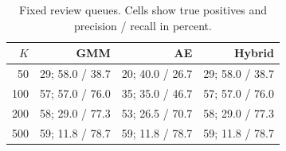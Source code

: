 \begin{table}[H]
\centering\footnotesize\setlength{\tabcolsep}{3pt}
\caption{Fixed review queues. Cells show true positives and precision / recall in percent.}
\label{tab:queues}
\begin{tabular}{rrrr}
\toprule
$K$ & GMM & AE & Hybrid \\
\midrule
50 & 29; 58.0 / 38.7 & 20; 40.0 / 26.7 & 29; 58.0 / 38.7 \\
100 & 57; 57.0 / 76.0 & 35; 35.0 / 46.7 & 57; 57.0 / 76.0 \\
200 & 58; 29.0 / 77.3 & 53; 26.5 / 70.7 & 58; 29.0 / 77.3 \\
500 & 59; 11.8 / 78.7 & 59; 11.8 / 78.7 & 59; 11.8 / 78.7 \\
\bottomrule
\end{tabular}
\end{table}

